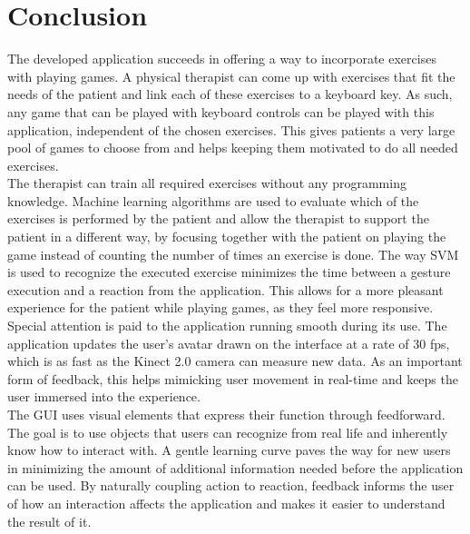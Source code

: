 \chapter{Conclusion}

The developed application succeeds in offering a way to incorporate exercises with playing games. A physical therapist can come up with exercises that fit the needs of the patient and link each of these exercises to a keyboard key. As such, any game that can be played with keyboard controls can be played with this application, independent of the chosen exercises. This gives patients a very large pool of games to choose from and helps keeping them motivated to do all needed exercises.\\

The therapist can train all required exercises without any programming knowledge. Machine learning algorithms are used to evaluate which of the exercises is performed by the patient and allow the therapist to support the patient in a different way, by focusing together with the patient on playing the game instead of counting the number of times an exercise is done. The way SVM is used to recognize the executed exercise minimizes the time between a gesture execution and a reaction from the application. This allows for a more pleasant experience for the patient while playing games, as they feel more responsive.\\

Special attention is paid to the application running smooth during its use. The application updates the user's avatar drawn on the interface at a rate of 30 fps, which is as fast as the Kinect 2.0 camera can measure new data. As an important form of feedback, this helps mimicking user movement in real-time and keeps the user immersed into the experience.\\

The GUI uses visual elements that express their function through feedforward. The goal is to use objects that users can recognize from real life and inherently know how to interact with. A gentle learning curve paves the way for new users in minimizing the amount of additional information needed before the application can be used. By naturally coupling action to reaction, feedback informs the user of how an interaction affects the application and makes it easier to understand the result of it.\\
